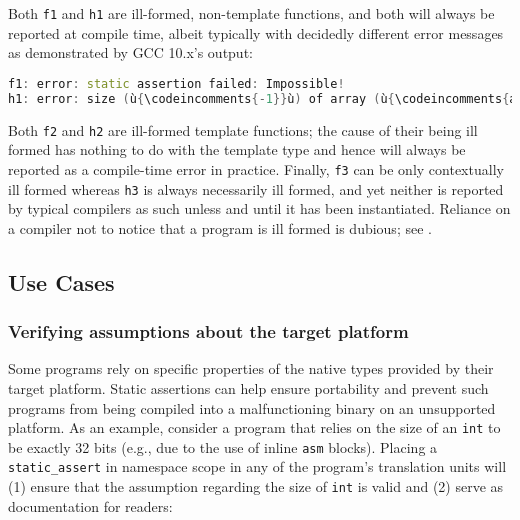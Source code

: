 \noindent Both \lstinline!f1! and \lstinline!h1! are ill-formed, non-template functions,
and both will always be reported at compile time, albeit typically with
decidedly different error messages as demonstrated by GCC 10.x's output:

\begin{lstlisting}[language=C++]
f1: error: static assertion failed: Impossible!
h1: error: size (ù{\codeincomments{-1}}ù) of array (ù{\codeincomments{a}}ù) is negative
\end{lstlisting}
    
\noindent Both \lstinline!f2! and \lstinline!h2! are ill-formed template functions; the cause of their being ill formed has nothing to do with the
template type and hence will always be reported as a compile-time error
in practice. Finally, \lstinline!f3! can be only contextually ill formed
whereas \lstinline!h3! is always necessarily ill formed, and yet neither is
reported by typical compilers as such unless and until it has been
instantiated. Reliance on a compiler not to notice that a program is
ill formed is dubious; see 
.

\subsection[Use Cases]{Use Cases}\label{use-cases}

\subsubsection[Verifying assumptions about the target platform]{Verifying assumptions about the target platform}\label{verifying-assumptions-about-the-target-platform}

Some programs rely on specific properties of the native types provided
by their target platform. Static assertions can help ensure portability
and prevent such programs from being compiled into a malfunctioning
binary on an unsupported platform. As an example, consider a
program that relies on the size of an \lstinline!int! to be exactly 32
bits (e.g., due to the use of inline \lstinline!asm! blocks). Placing a
\lstinline!static_assert! in namespace scope in any of the program's
translation units will (1) ensure that the assumption regarding the size
of \lstinline!int! is valid and (2) serve as documentation for readers:

